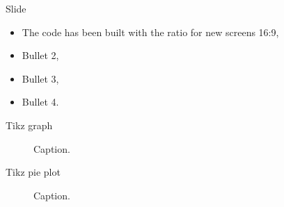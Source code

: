 


 \def\hasClickable{}

 
 
 
 
 

 
 




\ifx\currentAspect\oldAspect
	\def\sometext{The code has been built with the ratio for old screens 4:3}
\else
	\def\sometext{The code has been built with the ratio for new screens 16:9}
\fi



\begin{frame}{Slide }
\begin{itemize}
\setlength\itemsep{\fill}
\item \sometext,
\item Bullet 2,
\item Bullet 3,
\item Bullet 4.
\end{itemize}
\end{frame}


\begin{frame}{Tikz graph}
\begin{figure}[H]
\centering


\vspace{-10pt}
\caption{Caption.}
\end{figure}
\end{frame}

\begin{frame}{Tikz pie plot}
\begin{figure}[H]
\centering


\vspace{-10pt}
\caption{Caption.}
\end{figure}
\end{frame}


